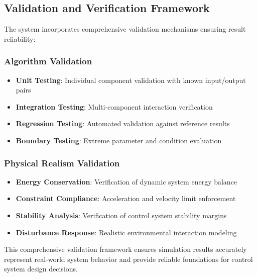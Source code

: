\subsection*{Validation and Verification Framework}

The system incorporates comprehensive validation mechanisms ensuring result reliability:

\subsubsection*{Algorithm Validation}
\begin{itemize}
    \item \textbf{Unit Testing}: Individual component validation with known input/output pairs
    \item \textbf{Integration Testing}: Multi-component interaction verification
    \item \textbf{Regression Testing}: Automated validation against reference results
    \item \textbf{Boundary Testing}: Extreme parameter and condition evaluation
\end{itemize}

\subsubsection*{Physical Realism Validation}
\begin{itemize}
    \item \textbf{Energy Conservation}: Verification of dynamic system energy balance
    \item \textbf{Constraint Compliance}: Acceleration and velocity limit enforcement
    \item \textbf{Stability Analysis}: Verification of control system stability margins
    \item \textbf{Disturbance Response}: Realistic environmental interaction modeling
\end{itemize}

This comprehensive validation framework ensures simulation results accurately represent real-world system behavior and provide reliable foundations for control system design decisions.
